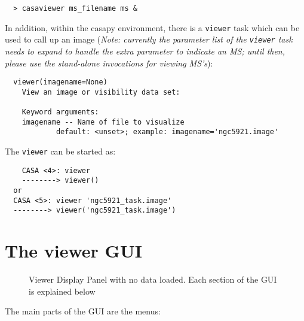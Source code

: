 \small
\begin{verbatim}
  > casaviewer ms_filename ms &
\end{verbatim}
\normalsize

In addition, within the casapy environment, there is a {\tt viewer} task
which can be used to call up an image ({\it Note: currently the
parameter list of the {\tt viewer} task needs to expand to handle the
extra parameter to indicate an MS; until then, please use the
stand-alone invocations for viewing MS's}):

\small
\begin{verbatim}
  viewer(imagename=None)
    View an image or visibility data set:
    
    Keyword arguments:
    imagename -- Name of file to visualize
            default: <unset>; example: imagename='ngc5921.image'
\end{verbatim}
\normalsize


The {\tt viewer} can be started as:

\small
\begin{verbatim}
    CASA <4>: viewer
    --------> viewer()
  or
  CASA <5>: viewer 'ngc5921_task.image'
  --------> viewer('ngc5921_task.image')
\end{verbatim}
\normalsize

\section{The viewer GUI}
\label{section:viewer.GUI}

\begin{figure}[ht]
\caption{\label{fig:viewer0} Viewer Display Panel with no data
  loaded. Each section of the GUI is explained below} 
\hrulefill
\end{figure}
 
The main parts of the GUI are the menus:

